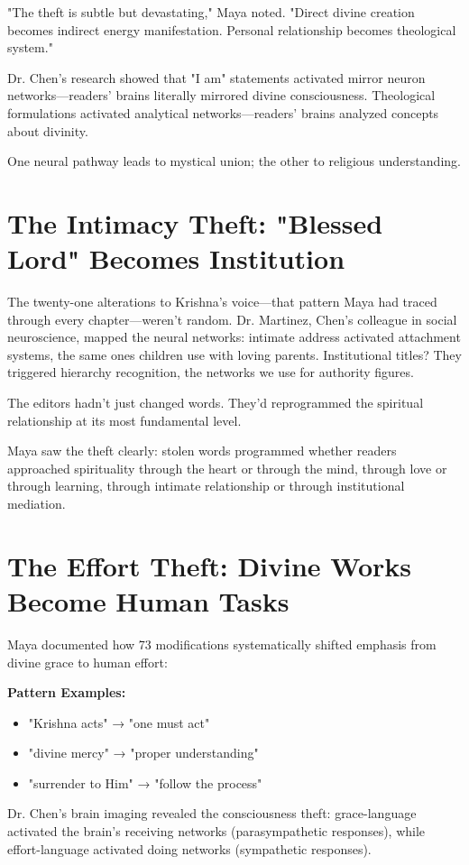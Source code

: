 \documentclass[11pt,twoside]{book}
\begin{document}
"The theft is subtle but devastating," Maya noted. "Direct divine creation becomes indirect energy manifestation. Personal relationship becomes theological system."

Dr. Chen's research showed that "I am" statements activated mirror neuron networks—readers' brains literally mirrored divine consciousness. Theological formulations activated analytical networks—readers' brains analyzed concepts about divinity.

One neural pathway leads to mystical union; the other to religious understanding.
\section*{The Intimacy Theft: "Blessed Lord" Becomes Institution}
\label{sec:org3553908}

The twenty-one alterations to Krishna's voice—that pattern Maya had traced through every chapter—weren't random. Dr. Martinez, Chen's colleague in social neuroscience, mapped the neural networks: intimate address activated attachment systems, the same ones children use with loving parents. Institutional titles? They triggered hierarchy recognition, the networks we use for authority figures. 

The editors hadn't just changed words. They'd reprogrammed the spiritual relationship at its most fundamental level.

Maya saw the theft clearly: stolen words programmed whether readers approached spirituality through the heart or through the mind, through love or through learning, through intimate relationship or through institutional mediation.
\section*{The Effort Theft: Divine Works Become Human Tasks}
\label{sec:orgbb1c9a7}

Maya documented how 73 modifications systematically shifted emphasis from divine grace to human effort:

\textbf{\textbf{Pattern Examples:}}
\begin{itemize}
\item "Krishna acts" → "one must act"
\item "divine mercy" → "proper understanding"
\item "surrender to Him" → "follow the process"
\end{itemize}

Dr. Chen's brain imaging revealed the consciousness theft: grace-language activated the brain's receiving networks (parasympathetic responses), while effort-language activated doing networks (sympathetic responses).
\end{document}
